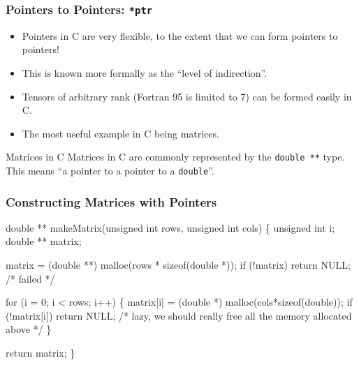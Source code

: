 \documentclass[table]{beamer}
\newif\ifschigh\schighfalse
\newcommand{\kw}[1]{\ifschigh\textcolor{red}{#1}\else\textcolor{keyword}{#1}\fi}
\newcommand{\kc}[1]{\ifschigh\textcolor{red}{#1}\else\textcolor{comment}{#1}\fi}
\newcounter{sckll}
\newcommand{\kr}{\setcounter{sckll}{1}}
\newcommand{\kl}{}
\begin{document}
{
\begin{frame}
\frametitle{Pointers to Pointers: {\tt **ptr}}
\begin{itemize}
\item Pointers in C are very flexible, to the extent that we can form pointers to pointers!
\item This is known more formally as the ``level of indirection''.
\item Tensors of arbitrary rank (Fortran 95 is limited to 7) can be formed easily in C.
\item The most useful example in C being matrices.
\end{itemize}
\begin{block}{Matrices in C}
Matrices in C are commonly represented by the {\tt \kw{double} **} type. This means ``a pointer to a pointer to a {\tt \kw{double}}''.
\end{block}
\end{frame}
}

\begin{frame}[fragile]
\frametitle{Constructing Matrices with Pointers}
\vspace{-0.2in}
\begin{semiverbatim}
\footnotesize
\kr\kl\kw{double} ** makeMatrix(\kw{unsigned int} rows, \kw{unsigned int} cols)
\kl\{
\kl   \kw{unsigned int} i;
\kl   \kw{double} ** matrix;
\kl        
\kl   matrix = (\kw{double} **) malloc(rows * \kw{sizeof}(\kw{double} *));
\kl   \kw{if} (!matrix) \kw{return} NULL; \kc{/* failed */}
\kl
\kl   \kw{for} (i = 0; i < rows; i++)
\kl   \{
\kl      matrix[i] = (\kw{double} *) malloc(cols*\kw{sizeof}(\kw{double}));
\kl      \kw{if} (!matrix[i])
\kl         \kw{return} NULL; \kc{/* lazy, we should really free} 
\kl                         \kc{all the memory allocated above */}
\kl   \}
\kl
\kl   \kw{return} matrix;
\kl\}
\end{semiverbatim}
\end{frame}
\end{document}
